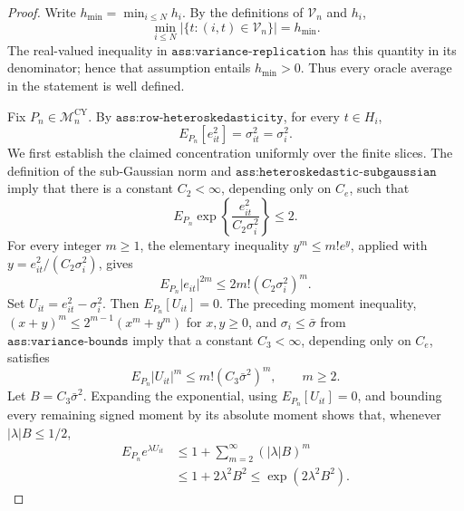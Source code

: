 \documentclass{article}
\begin{document}
\begin{proof}
Write \(h_{\min}=\min_{i\le N}h_i\).  By the definitions of
\(\mathcal V_n\) and \(h_i\),
\[
 \min_{i\le N}|\{t:(i,t)\in\mathcal V_n\}|=h_{\min}.
\]
The real-valued inequality in \(\texttt{ass:variance-replication}\) has
this quantity in its denominator; hence that assumption entails
\(h_{\min}>0\).  Thus every oracle average in the statement is well
defined.

Fix \(P_n\in\mathcal M_n^{\mathrm{CY}}\).  By
\(\texttt{ass:row-heteroskedasticity}\), for every \(t\in H_i\),
\[
 E_{P_n}[e_{it}^2]=\sigma_{it}^2=\sigma_i^2.
\]
We first establish the claimed concentration uniformly over the finite
slices.  The definition of the sub-Gaussian norm and
\(\texttt{ass:heteroskedastic-subgaussian}\) imply that there is a
constant \(C_2<\infty\), depending only on \(C_e\), such that
\[
 E_{P_n}\exp\!\left\{\frac{e_{it}^2}{C_2\sigma_i^2}\right\}\le2.
\]
For every integer \(m\ge1\), the elementary inequality
\(y^m\le m!e^y\), applied with
\(y=e_{it}^2/(C_2\sigma_i^2)\), gives
\[
 E_{P_n}|e_{it}|^{2m}
 \le 2m!(C_2\sigma_i^2)^m.
\]
Set \(U_{it}=e_{it}^2-\sigma_i^2\).  Then
\(E_{P_n}[U_{it}]=0\).  The preceding moment inequality,
\((x+y)^m\le2^{m-1}(x^m+y^m)\) for \(x,y\ge0\), and
\(\sigma_i\le\bar\sigma\) from \(\texttt{ass:variance-bounds}\) imply
that a constant \(C_3<\infty\), depending only on \(C_e\), satisfies
\[
 E_{P_n}|U_{it}|^m\le m!(C_3\bar\sigma^2)^m,
 \qquad m\ge2.
\]
Let \(B=C_3\bar\sigma^2\).  Expanding the exponential, using
\(E_{P_n}[U_{it}]=0\), and bounding every remaining signed moment by its
absolute moment shows that, whenever \(|\lambda|B\le1/2\),
\[
 \begin{aligned}
 E_{P_n}e^{\lambda U_{it}}
 &\le 1+\sum_{m=2}^{\infty}(|\lambda|B)^m\\
 &\le 1+2\lambda^2B^2
 \le \exp(2\lambda^2B^2).
 \end{aligned}
\]


\end{proof}
\end{document}
